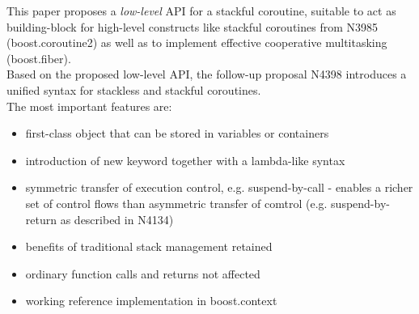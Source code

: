 This paper proposes a \emph{low-level} API for a stackful coroutine, suitable
to act as building-block for high-level constructs like stackful coroutines from
N3985\cite{N3985} (boost.coroutine2\cite{bcoroutine2}) as well as to implement
effective cooperative multitasking (boost.fiber\cite{bfiber}).\\
Based on the proposed low-level API, the follow-up proposal N4398\cite{N4398}
introduces a unified syntax for stackless and stackful coroutines.\\
\newline
The most important features are:
\begin{itemize}
    \item first-class object that can be stored in variables or containers
    \item introduction of new keyword \resumable together with a lambda-like
          syntax
    \item symmetric transfer of execution control, e.g. suspend-by-call -
          enables a richer set of control flows than asymmetric transfer of
          comtrol (e.g. suspend-by-return as described in N4134)
    \item benefits of traditional stack management retained
    \item ordinary function calls and returns not affected
    \item working reference implementation in boost.context\cite{bcontext}
\end{itemize}
